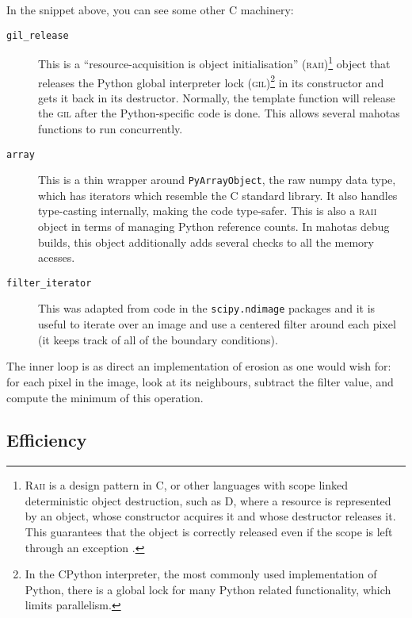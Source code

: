 \documentclass{scrartcl}
\newcommand*{\cpp}{{C\nolinebreak[4]\hspace{-.05em}\raisebox{.4ex}{\tiny\textbf{++}}}}
\let\code\texttt
\begin{document}
In the snippet above, you can see some other \cpp{} machinery:

\begin{description}
\item[\code{gil\_release}] This is a ``resource-acquisition is object
initialisation'' (\textsc{raii})\footnote{\textsc{Raii} is a design pattern in
\cpp{}, or other languages with scope linked deterministic object destruction,
such as D, where a resource is represented by an object, whose constructor
acquires it and whose destructor releases it. This guarantees that the object
is correctly released even if the scope is left through an exception
\citep{Stroustrup1994}.} object that releases the Python global interpreter lock
(\textsc{gil})\footnote{In the CPython interpreter, the most commonly used
implementation of Python, there is a global lock for many Python related
functionality, which limits parallelism.} in its constructor and gets it back
in its destructor. Normally, the template function will release the
\textsc{gil} after the Python-specific code is done. This allows several
mahotas functions to run concurrently.
\item[\code{array}] This is a thin wrapper around \code{PyArrayObject}, the raw
numpy data type, which has iterators which resemble the \cpp{} standard
library. It also handles type-casting internally, making the code type-safer.
This is also a \textsc{raii} object in terms of managing Python reference
counts. In mahotas debug builds, this object additionally adds several checks
to all the memory acesses.
\item[\code{filter\_iterator}] This was adapted from code in the
\code{scipy.ndimage} packages and it is useful to iterate over an image and use
a centered filter around each pixel (it keeps track of all of the boundary
conditions).
\end{description}

The inner loop is as direct an implementation of erosion as one would wish for:
for each pixel in the image, look at its neighbours, subtract the filter value,
and compute the minimum of this operation.

\subsection{Efficiency}
\end{document}
